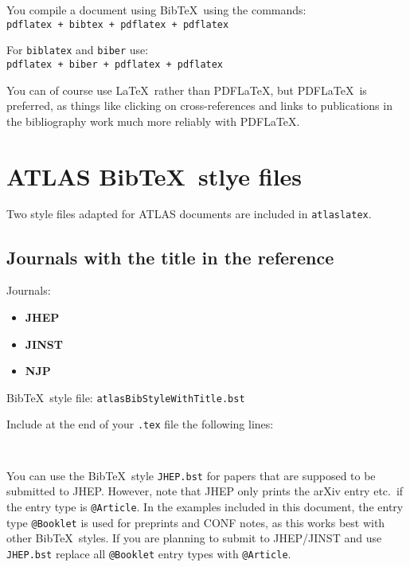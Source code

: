 \documentclass[UKenglish]{latex/atlasdoc}
\newcommand*{\BibTeX}{Bib\TeX}
\newcommand{\File}[1]{\texttt{#1}\xspace}
\newcommand{\Package}[1]{\texttt{#1}\xspace}
\begin{document}
You compile a document using \BibTeX\ using the commands:\\
\indent \texttt{pdflatex + bibtex + pdflatex + pdflatex}

\noindent For \texttt{biblatex} and \texttt{biber} use:\\
\indent \texttt{pdflatex + biber + pdflatex + pdflatex}

You can of course use \LaTeX\ rather than PDF\LaTeX, but PDF\LaTeX\ is preferred,
as things like clicking on cross-references and links to publications in the bibliography
work much more reliably with PDF\LaTeX.

\section{ATLAS \BibTeX\ stlye files}
\label{sec:atlasbst}

Two style files adapted for ATLAS documents are included in \Package{atlaslatex}.

\subsection{Journals with the title in the reference}
\label{sec:withtitle}

Journals:
\begin{itemize}\setlength{\parskip}{0pt}\setlength{\itemsep}{0pt}
\item \textbf{JHEP}
\item \textbf{JINST}
\item \textbf{NJP}
\end{itemize}
%
\BibTeX\ style file: \Package{atlasBibStyleWithTitle.bst}

\noindent Include at the end of your \File{.tex} file the following lines:
\begin{verbatim}


\end{verbatim}

You can use the \BibTeX\ style \File{JHEP.bst} for papers that are supposed to be submitted to JHEP.
However, note that JHEP only prints the arXiv entry etc.\ if the entry type is \texttt{@Article}.
In the examples included in this document,
the entry type \texttt{@Booklet} is used for preprints and CONF notes,
as this works best with other \BibTeX\ styles.
If you are planning to submit to JHEP/JINST and use \File{JHEP.bst} 
replace all \texttt{@Booklet} entry types with \texttt{@Article}.
\end{document}

